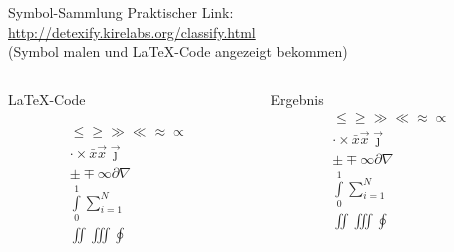 \begin{frame}[fragile]{
  Symbol-Sammlung
  \hfill{}
}
  Praktischer Link: \\
  \url{http://detexify.kirelabs.org/classify.html} \\
  (Symbol malen und LaTeX-Code angezeigt bekommen)
  \begin{columns}[T]
    \begin{column}{0.7\textwidth}
      \begin{block}{\LaTeX-Code}
        \begin{lstverbatim}
        \begin{align}
          \leq \geq \gg \ll \approx \propto \\
          \cdot \times \bar{x} \vec{x} \vec{\jmath} \\
          \pm \mp \infty \partial \nabla \\
          \int\limits_0^1 \sum\limits_{i=1}^N \\
          \iint \iiint \oint
        \end{align}
        \end{lstverbatim}
      \end{block}
    \end{column}
    \begin{column}{0.25\textwidth}
      \begin{block}{Ergebnis}
        \begin{align*}
          \leq \geq \gg \ll \approx \propto \\
          \cdot \times \bar{x} \vec{x} \vec{\jmath} \\
          \pm \mp \infty \partial \nabla \\
          \int\limits_0^1 \sum\limits_{i=1}^N \\
          \iint \iiint \oint
        \end{align*}
      \end{block}
    \end{column}
  \end{columns}
\end{frame}

